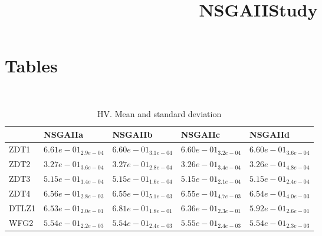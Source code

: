 \documentclass{article}
\title{NSGAIIStudy}
\author{}
\begin{document}
\maketitle
\section{Tables}
\
\begin{table}
\caption{HV. Mean and standard deviation}
\label{table:mean.HV}
\centering
\begin{scriptsize}
\begin{tabular}{lllll}
\hline & NSGAIIa & NSGAIIb & NSGAIIc &  NSGAIId\\
\hline
ZDT1 & \cellcolor{gray95}$  6.61e-01_{ 2.9e-04}$ & \cellcolor{gray25}$  6.60e-01_{ 3.1e-04}$ & $  6.60e-01_{ 3.2e-04}$ & $  6.60e-01_{ 3.6e-04}$ \\
ZDT2 & \cellcolor{gray95}$  3.27e-01_{ 3.6e-04}$ & \cellcolor{gray25}$  3.27e-01_{ 2.8e-04}$ & $  3.26e-01_{ 3.4e-04}$ & $  3.26e-01_{ 4.8e-04}$ \\
ZDT3 & \cellcolor{gray95}$  5.15e-01_{ 1.4e-04}$ & \cellcolor{gray25}$  5.15e-01_{ 1.6e-04}$ & $  5.15e-01_{ 2.1e-04}$ & $  5.15e-01_{ 2.4e-04}$ \\
ZDT4 & \cellcolor{gray95}$  6.56e-01_{ 2.8e-03}$ & $  6.55e-01_{ 5.1e-03}$ & \cellcolor{gray25}$  6.55e-01_{ 4.7e-03}$ & $  6.54e-01_{ 4.0e-03}$ \\
DTLZ1 & \cellcolor{gray25}$  6.53e-01_{ 2.0e-01}$ & \cellcolor{gray95}$  6.81e-01_{ 1.8e-01}$ & $  6.36e-01_{ 2.3e-01}$ & $  5.92e-01_{ 2.6e-01}$ \\
WFG2 & $  5.54e-01_{ 2.2e-03}$ & \cellcolor{gray25}$  5.54e-01_{ 2.4e-03}$ & \cellcolor{gray95}$  5.55e-01_{ 2.4e-03}$ & $  5.54e-01_{ 2.3e-03}$ \\
\hline
\end{tabular}
\end{scriptsize}
\end{table}
\
\end{document}
